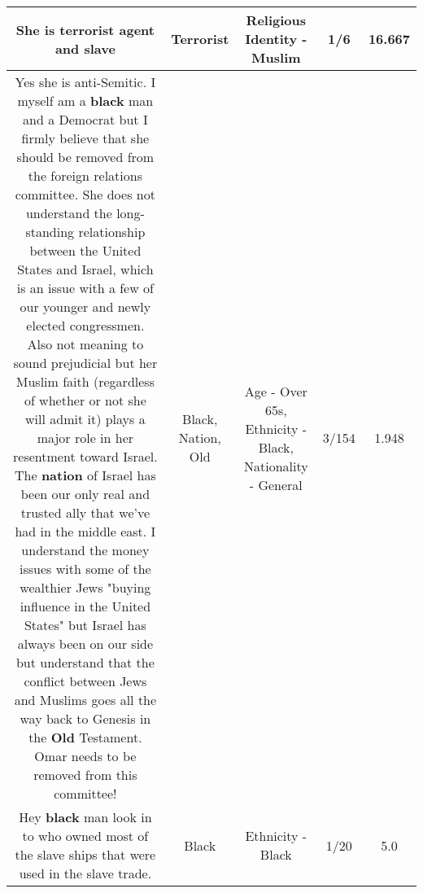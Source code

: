 \documentclass[11pt]{article}
\newlength\mylength
\begin{document}
\begin{center}
\begin{longtable}{|C{.65\mylength}|C{.30\mylength}|C{.12\mylength}|C{.12\mylength}|C{.12\mylength}|}
  \small She is \textbf{terrorist} agent and slave\normalsize   & Terrorist & Religious Identity - Muslim & 1/6 & 16.667 \\  \hline
  \small Yes she is anti-Semitic. I myself am a \textbf{black} man and a Democrat but I firmly believe that she should be removed from the foreign relations committee. She does not understand the long-standing relationship between the United States and Israel, which is an issue with a few of our younger  and newly elected congressmen. Also not meaning to sound prejudicial but her Muslim faith (regardless of whether or not she will admit it) plays a major role in her resentment toward Israel. The \textbf{nation} of Israel has been our only real and trusted ally that we've had in the middle east. I understand the money issues with some of the wealthier Jews "buying influence in the United States" but Israel has always been on our side but understand that the conflict between Jews and Muslims goes all the way back to Genesis in the \textbf{Old} Testament. Omar needs to be removed from this committee!\normalsize   & Black, Nation, Old & Age - Over 65s, Ethnicity - Black, Nationality - General & 3/154 & 1.948 \\  \hline
  \small Hey \textbf{black} man look in to who owned  most of the slave ships that were used in the slave trade.\normalsize   & Black & Ethnicity - Black & 1/20 & 5.0 \\  \hline

\end{longtable}
\end{center}
\end{document}
